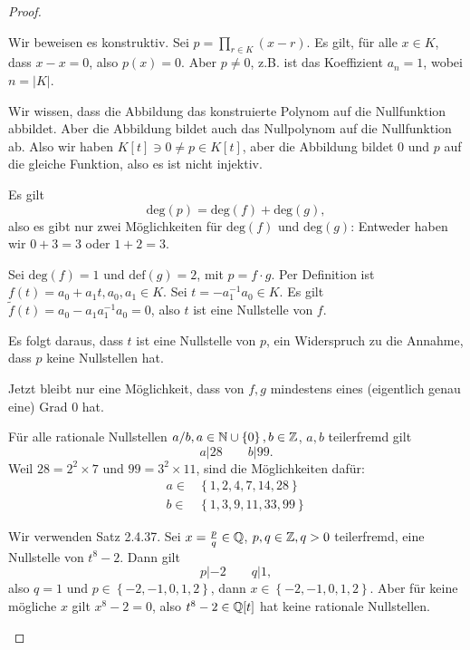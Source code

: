 \begin{proof}
	\begin{parts}
	\item Wir beweisen es konstruktiv. Sei $p=\prod_{r\in K} (x-r)  $. Es gilt, f\"{u}r alle $x\in K$, dass $x-x=0$, also $p(x)=0$. Aber $p\neq 0$, z.B. ist das Koeffizient $a_n=1$, wobei $n=|K|$.

		Wir wissen, dass die Abbildung das konstruierte Polynom auf die Nullfunktion abbildet. Aber die Abbildung bildet auch das Nullpolynom auf die Nullfunktion ab. Also wir haben $K[t]\ni 0 \neq p\in K[t]$, aber die Abbildung bildet $0$ und $p$ auf die gleiche Funktion, also es ist nicht injektiv.
	\item Es gilt
		\[
			\text{deg}(p)=\text{deg}(f)+\text{deg}(g)
		,\]
		also es gibt nur zwei Möglichkeiten f\"{u}r $\text{deg}(f)$ und $\text{deg}(g)$: Entweder haben wir $0+3=3$ oder $1+2=3$. 

		Sei $ \text{deg}(f)=1$ und $\text{def}(g)=2$, mit $p=f\cdot g$. Per Definition ist $f(t)=a_0+a_1t,a_0,a_1\in K$. Sei $t=-a_1^{-1}a_0\in K$. Es gilt $\tilde{f}(t)=a_0-a_1a_1^{-1}a_0=0$, also $ t$ ist eine Nullstelle von $f$. 

		Es folgt daraus, dass $t$ ist eine Nullstelle von $p$, ein Widerspruch zu die Annahme, dass $p$ keine Nullstellen hat.

		Jetzt bleibt nur eine Möglichkeit, dass von $f,g$ mindestens eines (eigentlich genau eine) Grad $0$ hat.
	\item F\"{u}r alle rationale Nullstellen $a / b, a\in \mathbb{N}\cup \left\{ 0 \right\} , b\in \mathbb{Z}$, $a,b$ teilerfremd gilt 
		\[
		a|28\qquad b|99
		.\] 
		Weil $28=2^2\times 7$ und $99=3^2\times 11$, sind die Möglichkeiten dafür:
		\begin{align*}
			a\in& \left\{1,2,4,7,14, 28 \right\} \\
			b\in& \left\{ 1,3,9,11,33,99 \right\} 
		\end{align*}
	\item Wir verwenden Satz 2.4.37. Sei $x=\frac{p}{q}\in \mathbb{Q}$, $p,q\in \mathbb{Z}, q >0$ teilerfremd, eine Nullstelle von $t^8-2$. Dann gilt
		\[
		p|-2\qquad q|1
		,\] 
		also $q=1$ und $p\in\left\{ -2,-1,0,1,2 \right\} $, dann $x\in \left\{ -2,-1,0,1,2 \right\} $. Aber f\"{u}r keine mögliche $x$ gilt $x^8-2=0$, also $t^8-2\in \mathbb{Q}[t]$ hat keine rationale Nullstellen.
	\item 
	\end{parts}
\end{proof}
